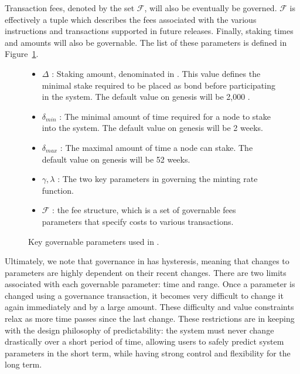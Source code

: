 \documentclass[runningheads]{llncs}
\begin{document}
Transaction fees, denoted by the set $\mathcal{F}$, will also be eventually be governed. 
$\mathcal{F}$ is effectively a tuple which describes the fees associated with the various instructions and transactions supported in future releases. 
Finally, staking times and amounts will also be governable. 
The list of these parameters is defined in Figure~\ref{fig:notation}.

\begin{figure}[hbtp]
\begin{framed}
\begin{itemize}
\item{$\Delta$} : Staking amount, denominated in \AVATokenName{}. This value defines the minimal stake required to be placed as bond before participating in the system. The default value on genesis will be 2,000 \AVATokenName{}.
\item{$\delta_{min}$} : The minimal amount of time required for a node to stake into the system. The default value on genesis will be 2 weeks.
\item{$\delta_{max}$} : The maximal amount of time a node can stake. The default value on genesis will be 52 weeks.
\item{$\gamma, \lambda$} : The two key parameters in governing the minting rate function. 
\item{$\mathcal{F}$} : the fee structure, which is a set of governable fees parameters that specify costs to various transactions.
\end{itemize}
\end{framed}
\caption{Key governable parameters used in \AVAPlatformName{}.}
\label{fig:notation}
\end{figure}

Ultimately, we note that governance in \AVATokenName{} has hysteresis, meaning that changes to parameters are highly dependent on their recent changes. There are two limits associated with each governable parameter: time and range. Once a parameter is changed using a governance transaction, it becomes very difficult to change it again immediately and by a large amount.  These difficulty and value constraints relax as more time passes since the last change. These restrictions are in keeping with the design philosophy of predictability: the system must never change drastically over a short period of time, allowing users to safely predict system parameters in the short term, while having strong control and flexibility for the long term.
\end{document}

